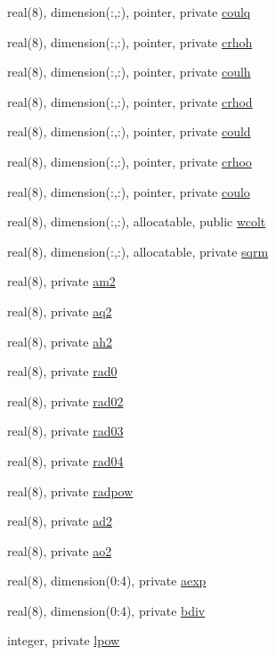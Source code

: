\begin{DoxyCompactItemize}
\item 
real(8), dimension(\+:,\+:), pointer, private \hyperlink{namespacecoulomb_af61c3d4b51a718e10c0f3c8c61dfbc3b}{coulq}
\item 
real(8), dimension(\+:,\+:), pointer, private \hyperlink{namespacecoulomb_a56407c554275cc11a67a47980763d288}{crhoh}
\item 
real(8), dimension(\+:,\+:), pointer, private \hyperlink{namespacecoulomb_ab5865baa231f13af37435598841c083b}{coulh}
\item 
real(8), dimension(\+:,\+:), pointer, private \hyperlink{namespacecoulomb_aae489523d013394686a4eccecbd8e671}{crhod}
\item 
real(8), dimension(\+:,\+:), pointer, private \hyperlink{namespacecoulomb_a3e49f8ac37da702af3537929c4ceec49}{could}
\item 
real(8), dimension(\+:,\+:), pointer, private \hyperlink{namespacecoulomb_a2815a44e5c576913488ddb7b3e67324d}{crhoo}
\item 
real(8), dimension(\+:,\+:), pointer, private \hyperlink{namespacecoulomb_a0c3ad1d6aead6c0e5df604afc7f5b682}{coulo}
\item 
real(8), dimension(\+:,\+:), allocatable, public \hyperlink{namespacecoulomb_a7fb786776bc5f65a639b10f9966ee2ee}{wcolt}
\item 
real(8), dimension(\+:,\+:), allocatable, private \hyperlink{namespacecoulomb_ae1cdbea5b00603d6ba85ce2d3e0bf612}{sqrm}
\item 
real(8), private \hyperlink{namespacecoulomb_ac7f2a0f0ede9bb820c275586d5f8cacb}{am2}
\item 
real(8), private \hyperlink{namespacecoulomb_aa8782d256d115e0d23441160078bd1c5}{aq2}
\item 
real(8), private \hyperlink{namespacecoulomb_a87a3eab5442a0668be2dfe42f7024081}{ah2}
\item 
real(8), private \hyperlink{namespacecoulomb_a207e347f3d5016b81ac37a1310c2919a}{rad0}
\item 
real(8), private \hyperlink{namespacecoulomb_a0776ab9d5ae0ca608ddbf4d147063405}{rad02}
\item 
real(8), private \hyperlink{namespacecoulomb_a9de74ed78e9600b349fa66222b9c19fb}{rad03}
\item 
real(8), private \hyperlink{namespacecoulomb_a313ec73163c8cb8f31d822c4d0efb479}{rad04}
\item 
real(8), private \hyperlink{namespacecoulomb_a8f7cac5e6ca7d551c55d4d3a4ba5ecbe}{radpow}
\item 
real(8), private \hyperlink{namespacecoulomb_afda3f373d6098c0a75ede859f3529343}{ad2}
\item 
real(8), private \hyperlink{namespacecoulomb_ab0ad8726c53cebe490cc86d05629aa7d}{ao2}
\item 
real(8), dimension(0\+:4), private \hyperlink{namespacecoulomb_a22c47ac5a6dd966aa0d24fa79c553716}{aexp}
\item 
real(8), dimension(0\+:4), private \hyperlink{namespacecoulomb_a1c828ee6bc3b2445d27ed8ce44d78300}{bdiv}
\item 
integer, private \hyperlink{namespacecoulomb_a3a24d1e9e066766553253e002f7114e0}{lpow}
\end{DoxyCompactItemize}


